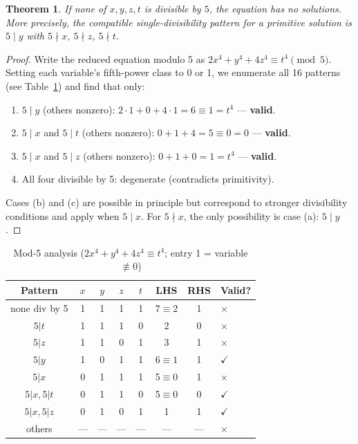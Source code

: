 \documentclass[12pt, a4paper]{article}
\newtheorem{theorem}{Theorem}[section]
\theoremstyle{definition}
\begin{document}
\begin{theorem}\label{thm:mod5}
  If none of $x,y,z,t$ is divisible by $5$, the equation has no solutions.
  More precisely, the compatible single-divisibility pattern for a primitive
  solution is $5 \mid y$ with $5 \nmid x$, $5 \nmid z$, $5 \nmid t$.
\end{theorem}

\begin{proof}
Write the reduced equation modulo 5 as $2x^4 + y^4 + 4z^4 \equiv t^4 \pmod{5}$.
Setting each variable's fifth-power class to 0 or 1, we enumerate all 16 patterns
(see Table~\ref{tab:mod5}) and find that only:
\begin{enumerate}[label=(\alph*)]
  \item $5 \mid y$ (others nonzero): $2 \cdot 1 + 0 + 4 \cdot 1 = 6 \equiv 1 = t^4$ — \textbf{valid}.
  \item $5 \mid x$ and $5 \mid t$ (others nonzero): $0 + 1 + 4 = 5 \equiv 0 = 0$ — \textbf{valid}.
  \item $5 \mid x$ and $5 \mid z$ (others nonzero): $0+1+0=1=t^4$ — \textbf{valid}.
  \item All four divisible by 5: degenerate (contradicts primitivity).
\end{enumerate}
Cases (b) and (c) are possible in principle but correspond to stronger divisibility
conditions and apply when $5 \mid x$.
For $5 \nmid x$, the only possibility is case (a): $5 \mid y$.
\end{proof}

\begin{table}[h]
\centering
\caption{Mod-5 analysis ($2x^4+y^4+4z^4 \equiv t^4$; entry 1 = variable $\not\equiv 0$)}
\label{tab:mod5}
\small
\begin{tabular}{ccccc|cc|l}
\toprule
Pattern & $x$ & $y$ & $z$ & $t$ & LHS & RHS & Valid?\\
\midrule
none div by 5 & 1 & 1 & 1 & 1 & $7 \equiv 2$ & 1 & $\times$ \\
$5|t$ & 1 & 1 & 1 & 0 & 2 & 0 & $\times$ \\
$5|z$ & 1 & 1 & 0 & 1 & 3 & 1 & $\times$ \\
$5|y$ & 1 & 0 & 1 & 1 & $6 \equiv 1$ & 1 & \textbf{$\checkmark$} \\
$5|x$ & 0 & 1 & 1 & 1 & 5$\equiv0$ & 1 & $\times$ \\
$5|x,5|t$ & 0 & 1 & 1 & 0 & 5$\equiv0$ & 0 & \textbf{$\checkmark$} \\
$5|x,5|z$ & 0 & 1 & 0 & 1 & 1 & 1 & \textbf{$\checkmark$} \\
others & — & — & — & — & — & — & $\times$ \\
\bottomrule
\end{tabular}
\end{table}
\end{document}
